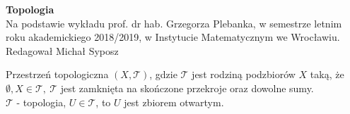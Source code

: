 \documentclass[twoside,10pt]{article}
\theoremstyle{definition}
\theoremstyle{definition}
\theoremstyle{definition}
\theoremstyle{definition}
\theoremstyle{remark}
\theoremstyle{definition}
\theoremstyle{definition}
\theoremstyle{definition}
\theoremstyle{definition}
\theoremstyle{definition}
\theoremstyle{definition}
\begin{document}
 
\begin{titlepage} 
    \begin{center} 
        \textbf{\Huge Topologia} \\[1cm]
        Na podstawie wykładu prof. dr hab. Grzegorza Plebanka, w semestrze letnim roku akademickiego 2018/2019,
        w Instytucie Matematycznym we Wrocławiu.\\ 
        Redagował Michał Syposz
    \end{center} 
    \tableofcontents
\end{titlepage} 
\begin{df} 
    Przestrzeń topologiczna $(X,\mathcal{T})$, gdzie $\mathcal{T}$ jest rodziną podzbiorów $X$
    taką, że $\emptyset,X \in \mathcal{T}, \ \mathcal{T}$ jest zamknięta na skończone przekroje oraz 
    dowolne sumy. \\
    $\mathcal{T}$ - topologia, $U \in \mathcal {T}$, to $U$ jest zbiorem otwartym.
\end{df} 
\end{document}
